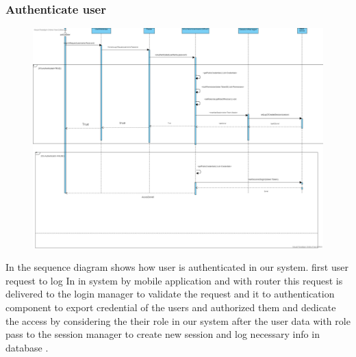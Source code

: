 \subsubsection{Authenticate user}
\begin{figure}[H]
\includegraphics[width=1\textwidth]{figures/RunTimeSequenceDiagram-Page-1.png}
\end{figure}
In the sequence diagram shows how user is authenticated in our system.
first user request to log In in system by mobile application and with router this request is delivered to the login manager to validate the request and it to authentication component to export credential of the users and authorized them and dedicate the access by considering the their role in our system after the user data with role pass to the session manager to create new session and log necessary info in database .

